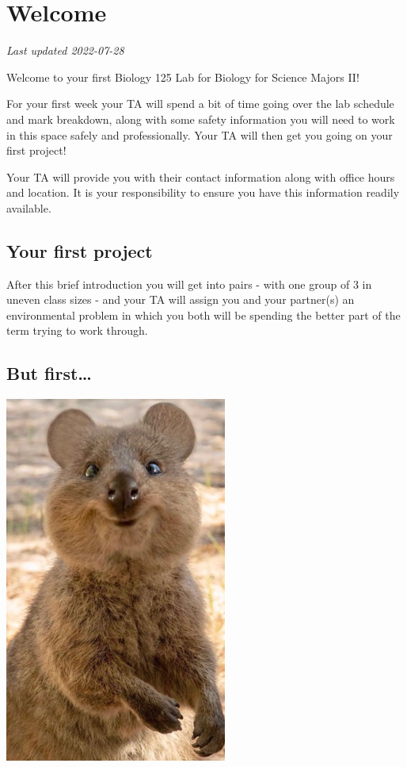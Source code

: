 \documentclass[
]{book}
\begin{document}
\hypertarget{welcome-1}{%
\chapter*{Welcome}\label{welcome-1}}

\emph{Last updated 2022-07-28}

Welcome to your first Biology 125 Lab for Biology for Science Majors II!

For your first week your TA will spend a bit of time going over the lab schedule and mark breakdown, along with some safety information you will need to work in this space safely and professionally. Your TA will then get you going on your first project!

Your TA will provide you with their contact information along with office hours and location. It is your responsibility to ensure you have this information readily available.

\hypertarget{your-first-project}{%
\section*{Your first project}\label{your-first-project}}

After this brief introduction you will get into pairs - with one group of 3 in uneven class sizes - and your TA will assign you and your partner(s) an environmental problem in which you both will be spending the better part of the term trying to work through.

\hypertarget{but-first}{%
\section*{But first\ldots{}}\label{but-first}}

\includegraphics{images/img-1.png}
\end{document}
